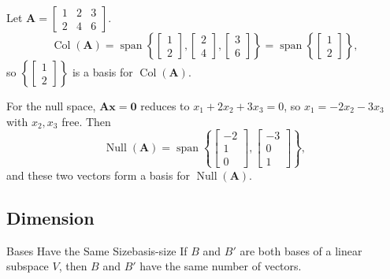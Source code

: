 \begin{example}
  Let $\mathbf{A} =
    \begin{bmatrix}
      1 & 2 & 3 \\ 2 & 4 & 6
    \end{bmatrix}
  $.
  \[
    \operatorname{Col}(\mathbf{A})
    = \operatorname{span}\left\{
    \begin{bmatrix}
      1 \\ 2
    \end{bmatrix}
    ,
    \begin{bmatrix}
      2 \\ 4
    \end{bmatrix}
    ,
    \begin{bmatrix}
      3 \\ 6
    \end{bmatrix}
    \right\}
    = \operatorname{span}\left\{
    \begin{bmatrix}
      1 \\ 2
    \end{bmatrix}
    \right\},
  \]
  so $\left\{
    \begin{bmatrix}
      1 \\ 2
    \end{bmatrix}
    \right\}$ is a basis for $\operatorname{Col}(\mathbf{A})$.

  For the null space, $\mathbf{A}\mathbf{x} = \mathbf{0}$ reduces to $x_1 + 2 x_2 + 3 x_3 = 0$, so $x_1 = -2 x_2 - 3 x_3$ with $x_2, x_3$ free. Then
  \[
    \operatorname{Null}(\mathbf{A})
    = \operatorname{span}\left\{
    \begin{bmatrix}
      -2 \\ 1 \\ 0
    \end{bmatrix}
    ,
    \begin{bmatrix}
      -3 \\ 0 \\ 1
    \end{bmatrix}
    \right\},
  \]
  and these two vectors form a basis for $\operatorname{Null}(\mathbf{A})$.
\end{example}

\subsection{Dimension}

\begin{theorem}{Bases Have the Same Size}{basis-size}
  If $B$ and $B'$ are both bases of a linear subspace $V$, then $B$ and $B'$ have the same number of vectors.
\end{theorem}

